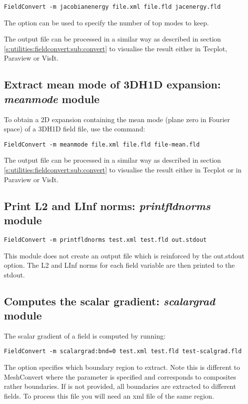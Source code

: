 \begin{lstlisting}[style=BashInputStyle] 
FieldConvert -m jacobianenergy file.xml file.fld jacenergy.fld
\end{lstlisting}

The option  can be used to specify the number of top modes to
keep.

The output file  can be processed in a similar 
way as described in section \ref{s:utilities:fieldconvert:sub:convert}
to visualise the result either in Tecplot, Paraview or VisIt. 

%
%
%

\subsection{Extract mean mode of 3DH1D expansion: \textit{meanmode} module}

To obtain a 2D expansion containing the mean mode (plane zero in Fourier space) of a
3DH1D field file, use the command:
\begin{lstlisting}[style=BashInputStyle] 
FieldConvert -m meanmode file.xml file.fld file-mean.fld
\end{lstlisting}

The output file  can be processed in a similar 
way as described in section \ref{s:utilities:fieldconvert:sub:convert}
to visualise the result either in Tecplot or in Paraview or VisIt.

%
%
%

\subsection{Print L2 and LInf norms: \textit{printfldnorms} module}

\begin{lstlisting}[style=BashInputStyle] 
FieldConvert -m printfldnorms test.xml test.fld out.stdout
\end{lstlisting}

This module does not create an output file which is reinforced by the
out.stdout option. The L2 and LInf norms for each field variable are
then printed to the stdout.

%
%
%

\subsection{Computes the scalar gradient: \textit{scalargrad} module}
The scalar gradient of a field is computed by running:
\begin{lstlisting}[style=BashInputStyle] 
FieldConvert -m scalargrad:bnd=0 test.xml test.fld test-scalgrad.fld
\end{lstlisting}
The option  specifies which boundary region to extract. Note this is different to MeshConvert where the parameter  is specified and corresponds to composites rather boundaries. If  is not provided, all boundaries are extracted to different fields. To process this file you will need an xml file of the same region. 

